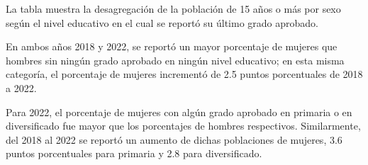 La tabla muestra la desagregación de la población de 15 años o más por sexo según el nivel educativo en el cual se reportó su último grado aprobado. 

En ambos años 2018 y 2022, se reportó un mayor porcentaje de mujeres que hombres sin ningún grado aprobado en ningún nivel educativo; en esta misma categoría, el porcentaje de mujeres incrementó de 2.5 puntos porcentuales de 2018 a 2022. 

Para 2022, el porcentaje de mujeres con algún grado aprobado en primaria o en diversificado fue mayor que los porcentajes de hombres respectivos. Similarmente, del 2018 al 2022 se reportó un aumento de dichas poblaciones de mujeres, 3.6 puntos porcentuales para primaria y 2.8 para diversificado. 